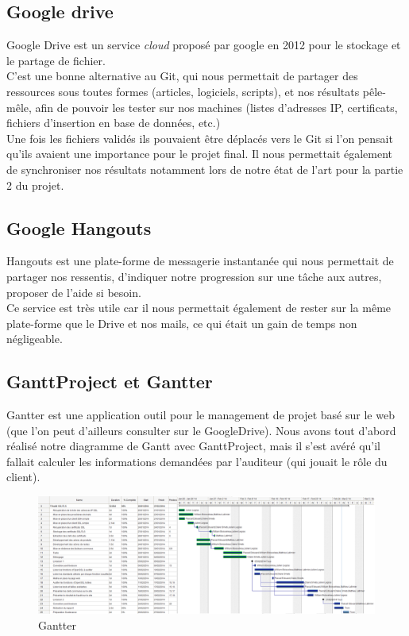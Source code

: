 \subsection{Google drive}

Google Drive est un service \textit{cloud} proposé par google en 2012 pour le stockage et le partage de fichier.\\

C'est une bonne alternative au Git, qui nous permettait de partager des ressources sous toutes formes (articles, logiciels, scripts), et nos résultats pêle-mêle, afin de pouvoir les tester sur nos machines (listes d'adresses IP, certificats, fichiers d'insertion en base de données, etc.)\\


Une fois les fichiers validés ils pouvaient être déplacés vers le Git si l'on pensait qu'ils avaient une importance pour le projet final. Il nous permettait également de synchroniser nos résultats notamment lors de notre état de l'art pour la partie 2 du projet.

\subsection{Google Hangouts}

Hangouts est une plate-forme de messagerie instantanée qui nous permettait de partager nos ressentis, d'indiquer notre progression sur une tâche aux autres, proposer de l'aide si besoin.\\
Ce service est très utile car il nous permettait également de rester sur la même plate-forme que le Drive et nos mails, ce qui était un gain de temps non négligeable.


\subsection{GanttProject et Gantter}

Gantter \cite{gantter} est une application outil pour le management de projet basé sur le web (que l'on peut d'ailleurs consulter sur le GoogleDrive).
Nous avons tout d'abord réalisé notre diagramme de Gantt avec GanttProject, mais il s'est avéré qu'il fallait calculer les informations demandées par l'auditeur (qui jouait le rôle du client).\\

\begin{figure}[H]
\begin{center}
\includegraphics[scale=0.28]{images/projet_gantter.png}
\end{center}
\caption{Gantter}
\label{gantter}
\end{figure}

